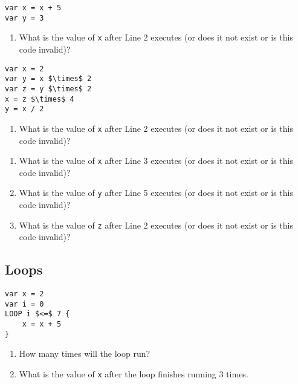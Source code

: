 \documentclass{article}
\begin{document}
\begin{Exercise}

\begin{lstlisting}[caption={Pseudocode.}, label={code:exercise_var_2}]
var x = x + 5
var y = 3
\end{lstlisting}

\begin{enumerate}
\item What is the value of \lstinline{x} after Line 2 executes (or does it not exist or is this code invalid)?
\end{enumerate}

\end{Exercise}

\begin{Exercise}

\begin{lstlisting}[caption={Pseudocode.}, label={code:exercise_var_3},mathescape]
var x = 2
var y = x $\times$ 2
var z = y $\times$ 2
x = z $\times$ 4
y = x / 2
\end{lstlisting}

\begin{enumerate}
\item What is the value of \lstinline{x} after Line 2 executes (or does it not exist or is this code invalid)?
\end{enumerate}

\begin{enumerate}
\item What is the value of \lstinline{x} after Line 3 executes (or does it not exist or is this code invalid)?
\item What is the value of \lstinline{y} after Line 5 executes (or does it not exist or is this code invalid)?
\item What is the value of \lstinline{z} after Line 2 executes (or does it not exist or is this code invalid)?
\end{enumerate}

\end{Exercise}

\subsection{Loops}
\setcounter{Exercise}{0}

\begin{Exercise}
\begin{lstlisting}[caption={Pseudocode.}, label={code:exercise_loop_1},mathescape]
var x = 2
var i = 0
LOOP i $<=$ 7 {
    x = x + 5
}
\end{lstlisting}

\begin{enumerate}
\item How many times will the loop run?
\item What is the value of \lstinline{x} after the loop finishes running $3$ times.
\end{enumerate}
\end{Exercise}
\end{document}
